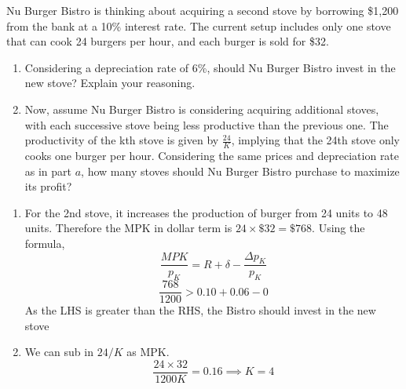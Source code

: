 \documentclass[addpoints,ngerman,12pt,answers]{exam}
\begin{document}
	\vspace*{3em}
	
	
	\vspace*{3em}
	\begin{questions}
		\question Nu Burger Bistro is thinking about acquiring a second stove by borrowing \$1,200 from the bank at a 10\% interest rate. The current setup includes only one stove that can cook 24 burgers per hour, and each burger is sold for \$32.
		\begin{enumerate}[label=(\alph*)]
			\item Considering a depreciation rate of 6\%, should Nu Burger Bistro invest in the new stove? Explain your reasoning.
			\item 
			Now, assume Nu Burger Bistro is considering acquiring additional stoves, with each successive stove being less productive than the previous one. The productivity of the kth stove is given by $\frac{24}{K}$, implying that the 24th stove only cooks one burger per hour. Considering the same prices and depreciation rate as in part $a$, how many stoves should Nu Burger Bistro purchase to maximize its profit?
		\end{enumerate}
	\newpage
	\begin{solution}
		\begin{enumerate}[label=(\alph*)]
			\item For the 2nd stove, it increases the production of burger from 24 units to 48 units. Therefore the MPK in dollar term is $24\times \$32 = \$768$. Using the formula,
			\[\frac{MPK}{p_K} = R+\delta -\frac{\Delta p_K}{p_K}\]
			\[\frac{768}{1200} > 0.10+ 0.06 - 0\]
			As the LHS is greater than the RHS, the Bistro should invest in the new stove
			\item We can sub in $24/K$ as MPK. 
			\[\frac{24\times 32}{1200K} = 0.16 \implies K=4\]
		\end{enumerate}
	\end{solution}		

	\end{questions}
	
	
\end{document}
